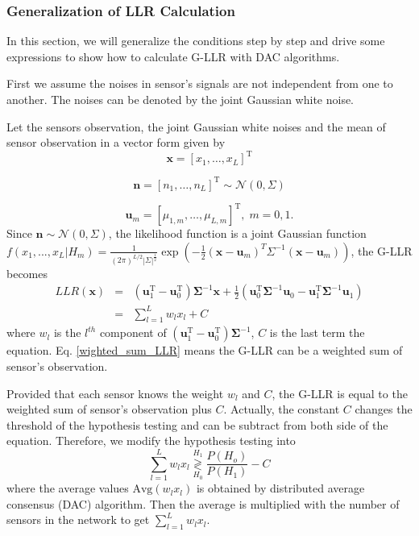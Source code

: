 \subsubsection*{Generalization of LLR Calculation }

In this section, we will generalize the conditions step by step and
drive some expressions to show how to calculate G-LLR with DAC algorithms. 

First we assume the noises in sensor's signals are not independent
from one to another. The noises can be denoted by the joint Gaussian
white noise. 

Let the sensors observation, the joint Gaussian white noises and the
mean of sensor observation in a vector form given by 
\[
\mathbf{x}=\left[x_{1},\ldots,x_{L}\right]^{\mathrm{T}}
\]


\[
\mathbf{n}=\left[n_{1},\ldots,n_{L}\right]^{\mathrm{T}}\sim\mathcal{N}\left(0,\Sigma\right)
\]


\begin{equation}
\mathbf{u}_{m}=\left[\mu_{1,m},\ldots,\mu_{L,m}\right]^{\mathrm{T}},\; m=0,1.
\end{equation}
Since $\mathbf{n}\sim\mathcal{N}\left(0,\Sigma\right)$, the likelihood
function is a joint Gaussian function $f\left(x_{1},...,x_{L}|H_{m}\right)=\frac{1}{\left(2\pi\right)^{L/2}\left|\Sigma\right|^{\frac{1}{2}}}\exp\left(-\frac{1}{2}\left(\mathbf{x}-\mathbf{u}_{m}\right)^{T}\Sigma^{-1}\left(\mathbf{x}-\mathbf{u}_{m}\right)\right)$,
the G-LLR becomes 
\begin{eqnarray}
LLR(\mathbf{x}) & = & \left(\mathbf{u}_{1}^{\mathrm{T}}-\mathbf{u}_{0}^{\mathrm{T}}\right)\mathbf{\Sigma}^{-1}\mathbf{x}+\frac{1}{2}\left(\mathbf{u}_{0}^{\mathrm{T}}\mathbf{\Sigma}^{-1}\mathbf{u}_{0}-\mathbf{u}_{1}^{\mathrm{T}}\mathbf{\Sigma}^{-1}\mathbf{u}_{1}\right)\label{eq:wighted_sum_LLR}\\
 & = & \sum_{l=1}^{L}w_{l}x_{l}+C\nonumber 
\end{eqnarray}
where $w_{l}$ is the $l^{th}$ component of $\left(\mathbf{u}_{1}^{\mathrm{T}}-\mathbf{u}_{0}^{\mathrm{T}}\right)\mathbf{\Sigma}^{-1}$,
$C$ is the last term the equation. Eq. \eqref{wighted_sum_LLR} means
the G-LLR can be a weighted sum of sensor's observation. 

Provided that each sensor knows the weight $w_{l}$ and $C$, the
G-LLR is equal to the weighted sum of sensor's observation plus $C$.
Actually, the constant $C$ changes the threshold of the hypothesis
testing and can be subtract from both side of the equation. Therefore,
we modify the hypothesis testing into 
\[
\sum_{l=1}^{L}w_{l}x_{l}\underset{H_{0}}{\overset{H_{1}}{\gtrless}}\frac{P\left(H_{o}\right)}{P\left(H_{1}\right)}-C
\]
where the average values $\mbox{Avg}\left(w_{l}x_{l}\right)$ is obtained
by distributed average consensus (DAC) algorithm. Then the average
is multiplied with the number of sensors in the network to get $\sum_{l=1}^{L}w_{l}x_{l}$.



